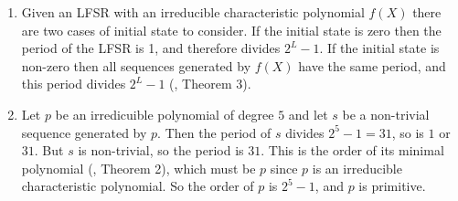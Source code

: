 \begin{enumerate}

\item Given an LFSR with an irreducible characteristic polynomial $f(X)$ there 
are two cases of initial state to consider. If the initial state is zero then 
the period of the LFSR is 1, and therefore divides $2^{L} - 1$. If the initial
state is non-zero then all sequences generated by $f(X)$ have the same period, 
and this period divides $2^{L} - 1$ (\cite{slides}, Theorem 3).

\item Let $p$ be an irredicuible polynomial of degree $5$ and let $s$ be a non-trivial
sequence generated by $p$. Then the period of $s$ divides $2^5-1=31$, so is $1$ or $31$.
But $s$ is non-trivial, so the period is $31$. This is the order of its minimal polynomial
(\cite{slides}, Theorem 2), which must be $p$ since $p$ is an irreducible characteristic
polynomial. So the order of $p$ is $2^5-1$, and $p$ is primitive.

\end{enumerate}
